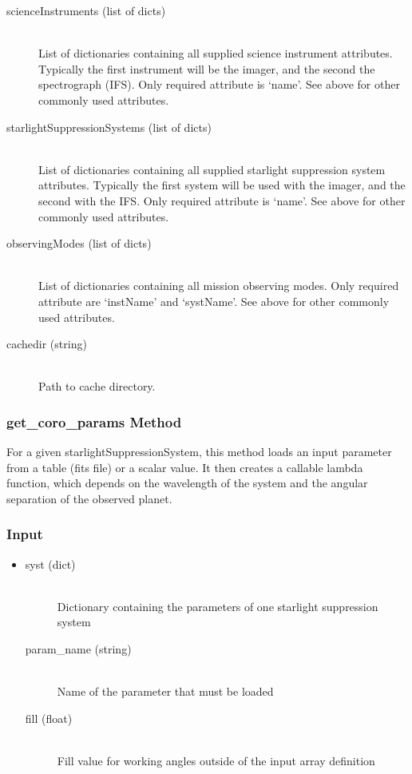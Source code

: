 \documentclass[cleanfoot]{asme2ej}
\begin{document}
\begin{itemize}
\begin{description}
    \item[scienceInstruments (list of dicts)] \hfill \\  List of dictionaries containing all supplied science instrument attributes.  Typically the first instrument will be the imager, and the second the spectrograph (IFS). Only required attribute is `name'.  See above for other commonly used attributes. 
    \item[starlightSuppressionSystems (list of dicts)] \hfill \\  List of dictionaries containing all supplied starlight suppression system attributes. Typically the first system will be used with the imager, and the second with the IFS. Only required attribute is `name'. See above for other commonly used attributes.
    \item[observingModes (list of dicts)] \hfill \\  List of dictionaries containing all mission observing modes. Only required attribute are `instName' and `systName'. See above for other commonly used attributes.
    \item[cachedir (string)] \hfill \\ Path to cache directory.
\end{description}
\end{itemize}

\subsubsection{get\_coro\_params Method}
For a given starlightSuppressionSystem, this method loads an input parameter from a table (fits file) or a scalar value. It then creates a callable lambda function, which depends on the wavelength of the system and the angular separation of the observed planet.
\subsubsection*{Input}
\begin{itemize}
\item
\begin{description}
    \item[syst (dict)] \hfill \\ Dictionary containing the parameters of one starlight suppression system
    \item[param\_name (string)] \hfill \\ Name of the parameter that must be loaded
    \item[fill (float)] \hfill \\ Fill value for working angles outside of the input array definition
\end{description}
\end{itemize}
\end{document}
